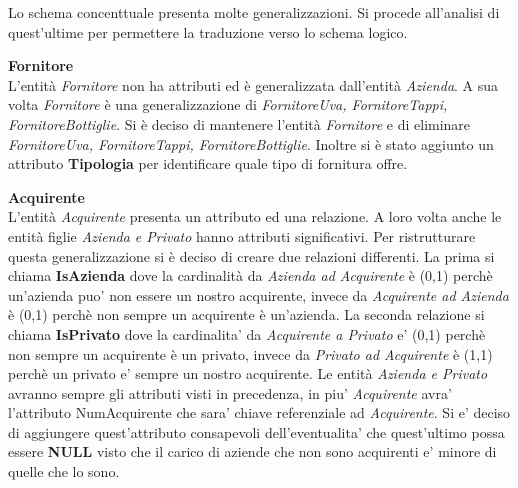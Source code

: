 Lo schema concenttuale presenta molte generalizzazioni. Si procede all'analisi di quest'ultime per permettere la traduzione verso lo schema logico.\\

\begin{flushleft}
	\textbf{\large{Fornitore}}\\
	L'entità \emph{Fornitore} non ha attributi ed è generalizzata dall'entità \emph{Azienda}. A sua volta \emph{Fornitore} è una generalizzazione di \emph{FornitoreUva, FornitoreTappi, FornitoreBottiglie}. Si è deciso di mantenere l'entità \emph{Fornitore} e di eliminare \emph{FornitoreUva, FornitoreTappi, FornitoreBottiglie}. Inoltre si è stato aggiunto un attributo \textbf{Tipologia} per identificare quale tipo di fornitura offre.
\end{flushleft}


\begin{flushleft}
	\textbf{\large{Acquirente}}\\
	L'entità \emph{Acquirente} presenta un attributo ed una relazione. A loro volta anche le entità figlie \emph{Azienda e Privato} hanno attributi significativi. Per ristrutturare questa generalizzazione si è deciso di creare due relazioni differenti. La prima si chiama \textbf{IsAzienda} dove la cardinalità da \emph{Azienda ad Acquirente} è (0,1) perchè un'azienda puo' non essere un nostro acquirente, invece da \emph{Acquirente ad Azienda} è (0,1) perchè non sempre un acquirente è un'azienda.
	La seconda relazione si chiama \textbf{IsPrivato} dove la cardinalita' da \emph{Acquirente a Privato} e' (0,1) perchè non sempre un acquirente è un privato, invece da \emph{Privato ad Acquirente} è (1,1) perchè un privato e' sempre un nostro acquirente. Le entità \emph{Azienda e Privato} avranno sempre gli attributi visti in precedenza, in piu' \emph{Acquirente} avra' l'attributo NumAcquirente che sara' chiave referenziale ad \emph{Acquirente}. Si e' deciso di aggiungere quest'attributo consapevoli dell'eventualita' che quest'ultimo possa essere \textbf{NULL} visto che il carico di aziende che non sono acquirenti e' minore di quelle che lo sono.
\end{flushleft}

